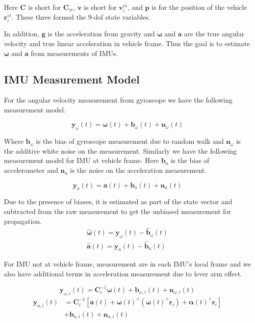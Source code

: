 \documentclass[conference]{IEEEtran}
\begin{document}
Here $\textbf{C}$ is short for $\textbf{C}_{iv}$, $\textbf{v}$ is short for $\textbf{v}_i^{vi}$, and $\textbf{p}$ is for the position of the vehicle $\textbf{r}_i^{vi}$. These three formed the 9-dof state variables.

In addition, $\textbf{g}$ is the acceleration from gravity and $\bm{\omega}$ and $\textbf{a}$ are the true angular velocity and true linear acceleration in vehicle frame. Thus the goal is to estimate $\bm{\omega}$ and $\textbf{a}$ from measurements of IMUs.

\subsection{IMU Measurement Model}

For the angular velocity measurement from gyroscope we have the following measurement model.

\begin{equation}
    \textbf{y}_\omega(t) = \bm{\omega}(t) + \textbf{b}_\omega(t) + \textbf{n}_\omega(t)
\end{equation}

Where $\textbf{b}_\omega$ is the bias of gyroscope measurement due to random walk and $\textbf{n}_\omega$ is the additive white noise on the measurement. Similarly we have the following measurement model for IMU at vehicle frame. Here $\textbf{b}_a$ is the bias of accelerometer and $\textbf{n}_a$ is the noise on the acceleration measurement.

\begin{equation}
    \textbf{y}_a(t) = \textbf{a}(t) + \textbf{b}_a(t) + \textbf{n}_a(t)
\end{equation}

Due to the presence of biases, it is estimated as part of the state vector and subtracted from the raw measurement to get the unbiased measurement for propagation.
\begin{equation}
\begin{split}
    \hat{\bm{\omega}}(t) = \textbf{y}_\omega(t) - \hat{\textbf{b}}_\omega(t) \\
    \hat{\textbf{a}}(t)  = \textbf{y}_a(t) - \hat{\textbf{b}}_a(t)
\end{split}
\end{equation}

For IMU not at vehicle frame, measurement are in each IMU's local frame and we also have additional terms in acceleration measurement due to lever arm effect.

\begin{equation}
    \textbf{y}_{\omega,i}(t) = \textbf{C}_{i}^{-1} \bm{\omega}(t) + \textbf{b}_{\omega, i}(t) + \textbf{n}_{\omega,i}(t)
\end{equation}
\begin{equation}
\begin{split}
    \textbf{y}_{a,i}(t) &= \textbf{C}_i^{-1} \left[ \textbf{a}(t) + \bm{\omega}(t)^\wedge (\bm{\omega}(t)^\wedge \textbf{r}_i) + \bm{\alpha}(t)^\wedge \textbf{r}_i \right] \\
    &+ \textbf{b}_{a,i}(t) + \textbf{n}_{a,i}(t)
\end{split}
\end{equation}
\end{document}
